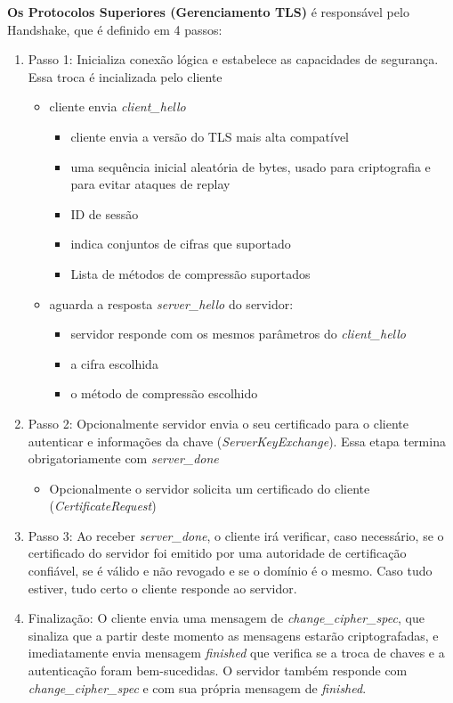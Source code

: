 \documentclass[]{article}
\begin{document}
\textbf{Os Protocolos Superiores (Gerenciamento TLS)} é responsável pelo Handshake, que é definido em 4 passos:
\begin{enumerate}
	\item Passo 1: Inicializa conexão lógica e estabelece as capacidades de segurança. Essa troca é incializada pelo cliente
	\begin{itemize}
		\item cliente envia \textit{client\_hello}
		\begin{itemize}
			\item cliente envia a versão do TLS mais alta compatível
			\item uma sequência inicial aleatória de bytes, usado para criptografia e para evitar ataques de replay 
			\item ID de sessão
			\item indica conjuntos de cifras que suportado
			\item Lista de métodos de compressão suportados
		\end{itemize}
		\item aguarda a resposta \textit{server\_hello} do servidor:
		\begin{itemize}
			\item servidor responde com os mesmos parâmetros do \textit{client\_hello}
			\item a cifra escolhida
			\item o método de compressão escolhido
		\end{itemize}
	\end{itemize}
	
	\item Passo 2: Opcionalmente servidor envia o seu certificado para o cliente autenticar e informações da chave (\textit{ServerKeyExchange}). Essa etapa termina obrigatoriamente com \textit{server\_done}
	\begin{itemize}
		\item Opcionalmente o servidor solicita um certificado do cliente (\textit{CertificateRequest})
	\end{itemize}
	
	\item Passo 3: Ao receber \textit{server\_done}, o cliente irá verificar, caso necessário, se o certificado do servidor foi emitido por uma autoridade de certificação confiável, se é válido e não revogado e se o domínio é o mesmo. Caso tudo estiver, tudo certo o cliente responde ao servidor.
	
	\item Finalização: O cliente envia uma mensagem de \textit{change\_cipher\_spec}, que sinaliza que a partir deste momento as mensagens estarão criptografadas, e imediatamente envia mensagem \textit{finished} que verifica se a troca de chaves e a autenticação foram bem-sucedidas. O servidor também responde com \textit{change\_cipher\_spec} e com sua própria mensagem de \textit{finished}. 
	

\end{enumerate}
\end{document}
